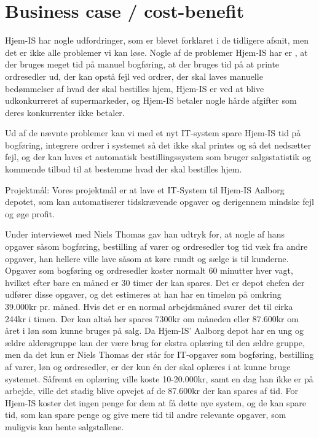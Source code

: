 \section{Business case / cost-benefit}\label{businesscase}
Hjem-IS har nogle udfordringer, som er blevet forklaret i de tidligere afsnit, men det er ikke alle problemer vi kan løse. Nogle af de problemer Hjem-IS har er , at der bruges meget tid på manuel bogføring, at der bruges tid på at printe ordresedler ud, der kan opstå fejl ved ordrer, der skal laves manuelle bedømmelser af hvad der skal bestilles hjem, Hjem-IS er ved at blive udkonkurreret af supermarkeder, og Hjem-IS betaler nogle hårde afgifter som deres konkurrenter ikke betaler.

Ud af de nævnte problemer kan vi med et nyt IT-system spare Hjem-IS tid på bogføring, integrere ordrer i systemet så det ikke skal printes og så det nedsætter fejl, og der kan laves et automatisk bestillingssystem som bruger salgsstatistik og kommende tilbud til at bestemme hvad der skal bestilles hjem. 

Projektmål:
Vores projektmål er at lave et IT-System til Hjem-IS Aalborg depotet, som kan automatiserer tidskrævende opgaver og derigennem mindske fejl og øge profit.

Under interviewet med Niels Thomas gav han udtryk for, at nogle af hans opgaver såsom bogføring, bestilling af varer og ordresedler tog tid væk fra andre opgaver, han hellere ville lave såsom at køre rundt og sælge is til kunderne. 
Opgaver som bogføring og ordresedler koster normalt 60 minutter hver vagt, hvilket efter bare en måned er 30 timer der kan spares. Det er depot chefen der udfører disse opgaver, og det estimeres at han har en timeløn på omkring 39.000kr pr. måned. Hvis det er en normal arbejdsmåned svarer det til cirka 244kr i timen. Der kan altså her spares 7300kr om måneden eller 87.600kr om året i løn som kunne bruges på salg. 
Da Hjem-IS’ Aalborg depot har en ung og ældre aldersgruppe kan der være brug for ekstra oplæring til den ældre gruppe, men da det kun er Niels Thomas der står for IT-opgaver som bogføring, bestilling af varer, løn og ordresedler, er der kun én der skal oplæres i at kunne bruge systemet. Såfremt en oplæring ville koste 10-20.000kr, samt en dag han ikke er på arbejde, ville det stadig blive opvejet af de 87.600kr der kan spares af tid\cite{Organisation}.
For Hjem-IS koster det ingen penge for dem at få dette nye system, og de kan spare tid, som kan spare penge og give mere tid til andre relevante opgaver, som muligvis kan hente salgstallene.

